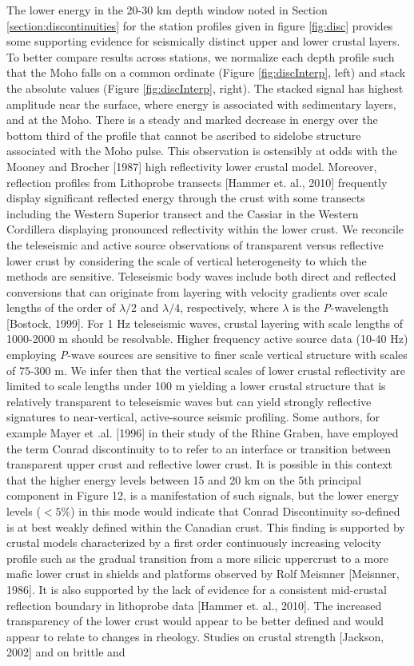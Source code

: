\documentclass[draft, 12pt]{article}
\begin{document}
The lower energy in the 20-30 km depth window noted in Section \ref{section:discontinuities} for the station profiles given in figure \ref{fig:disc} provides some supporting evidence for seismically distinct upper and lower crustal layers. To better compare results across stations, we normalize each depth profile such that the Moho falls on a common ordinate (Figure \ref{fig:discInterp}, left) and stack the absolute values (Figure \ref{fig:discInterp}, right). The stacked signal has highest amplitude near the surface, where energy is associated with sedimentary layers, and at the Moho. There is a steady and marked decrease in energy over the bottom third of the profile that cannot be ascribed to sidelobe structure associated with the Moho pulse. This observation is ostensibly at odds with the Mooney and Brocher [1987] high reflectivity lower crustal model. Moreover, reflection profiles from {\sc Lithoprobe} transects [Hammer et. al., 2010] frequently display significant reflected energy through the crust with some transects including the Western Superior transect and the Cassiar in the Western Cordillera displaying pronounced reflectivity within the lower crust. We reconcile the teleseismic and active source observations of transparent versus reflective lower crust by considering the scale of vertical heterogeneity to which the methods are sensitive. Teleseismic body waves include both direct and reflected conversions that can originate from layering with velocity gradients over scale lengths of the order of $\lambda/2$ and $\lambda/4$, respectively, where $\lambda$ is the {\it P}-wavelength [Bostock, 1999]. For 1 Hz teleseismic waves, crustal layering with scale lengths of 1000-2000 m should be resolvable. Higher frequency active source data (10-40 Hz) employing {\it P}-wave sources are sensitive to finer scale vertical structure with scales of 75-300 m. We infer then that the vertical scales of lower crustal reflectivity are limited to scale lengths under 100 m yielding a lower crustal structure that is relatively transparent to teleseismic waves but can yield strongly reflective signatures to near-vertical, active-source seismic profiling.  Some authors, for example Mayer et .al. [1996] in their study of the Rhine Graben, have employed the term Conrad discontinuity to to refer to an interface or transition between transparent upper crust and reflective lower crust. It is possible in this context that the higher energy levels between 15 and 20 km on the 5th principal component in Figure 12, is a manifestation of such signals, but the lower energy levels ($<5\%$) in this mode would indicate that Conrad Discontinuity so-defined is at best weakly defined within the Canadian crust. This finding is supported by crustal models characterized by a first order continuously increasing velocity profile such as the gradual transition from a more silicic uppercrust to a more mafic lower crust in shields and platforms observed by Rolf Meisnner [Meisnner, 1986]. It is also supported by the lack of evidence for a consistent mid-crustal reflection boundary in lithoprobe data [Hammer et. al., 2010]. The increased transparency of the lower crust would appear to be better defined and would appear to relate to changes in rheology. Studies on crustal strength [Jackson, 2002] and on brittle and 
\end{document}
